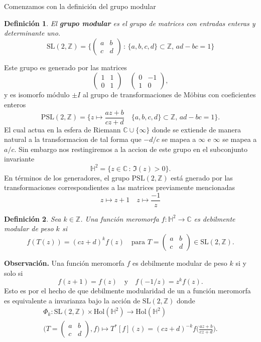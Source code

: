 \documentclass[letterpaper]{article}
\newtheorem{def.}{Definici\'on}[section]
\newcommand{\zah}{\ensuremath{ \mathbb Z }}
\newcommand{\obs}{{\newline \noindent \sc \textbf{Observación. }}}
\newcommand{\co}{\ensuremath{\mathbb C }}
\newcommand{\slz}{\ensuremath{\mathrm{SL}(2,\mathbb Z) }}
\newcommand{\pslz}{\ensuremath{\mathrm{PSL}(2,\mathbb Z) }}
\newcommand{\hd}{\ensuremath{\mathbb H^2}}
\newcommand{\hol}{\ensuremath{\mathrm{Hol}}}
\begin{document}
Comenzamos con la definición del grupo modular
\begin{def.}
El \textbf{grupo modular} es el grupo de matrices con entradas enteras y determinante uno.
\begin{equation}
    \slz=\Big\{ \begin{pmatrix}a & b\\ c & d \end{pmatrix} \,:\,\{a,b,c,d\}\subset\zah,\,ad-bc=1\Big\}
\end{equation}
\end{def.}
Este grupo es generado por las matrices
\[
    \begin{pmatrix}1 & 1\\ 0 & 1 \end{pmatrix}\quad\begin{pmatrix}0 & -1\\ 1 & 0 \end{pmatrix},
\]
y es isomorfo módulo \(\pm I\) al grupo de transformaciones de Möbius con coeficientes enteros
\[
    \pslz=\big\{z\mapsto\frac{az+b}{cz+d}\quad\{a,b,c,d\}\subset\zah,\,ad-bc=1\big\}.
\]
El cual actua en la esfera de Riemann \(\co\cup\{\infty\}\) donde se extiende de manera natural a la transformacion de tal forma que \(-d/c\) se mapea a \(\infty\) e \(\infty\) se mapea a \(a/c\). Sin embargo nos restingiremos a la accion de este grupo en el subconjunto invariante
\[
    \hd=\{z\in\co\,:\,\Im(z)>0\}.
\]
En términos de los generadores, el grupo \(\pslz\) está gnerado por las transformaciones correspondientes a las matrices previamente mencionadas
\[
    z\mapsto z+1\quad z\mapsto\frac{-1}{z}
\]
\begin{def.}
Sea \(k\in\zah\). Una función meromorfa \(f:\hd\rightarrow\co\) es debilmente modular de peso \(k\) si
\[
    f(T(z))=(cz+d)^{k}f(z)\quad\text{para } T=\begin{pmatrix}a & b\\ c & d \end{pmatrix}\in\slz.
\]
\end{def.}
\obs Una función meromorfa \(f\) es debilmente modular de peso \(k\) si y solo si
\[
    f(z+1)=f(z)\quad\text{y}\quad f(-1/z)=z^{k}f(z).
\]
Esto es por el hecho de que debilmente modularidad de un a función meromorfa es equivalente a invarianza bajo la acción de \(\slz\) donde
\begin{align*}\label{accion-mod}
        \Phi_k:\slz\times\hol(\hd)\rightarrow\hol(\hd)\\
        \Big(T=\begin{pmatrix}a & b\\ c & d \end{pmatrix},f\Big)\mapsto T^{*}[f](z)=(cz+d)^{-k}f\Big(\frac{az+b}{cz+d}\Big).
\end{align*}
\end{document}
